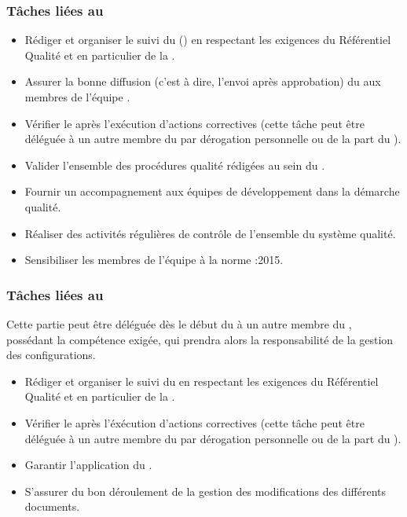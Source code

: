 \subsubsection*{Tâches liées au \PQCourt}
\begin{itemize}
	\item Rédiger et organiser le suivi du \PQ (\PQCourt) en respectant les exigences du Référentiel Qualité et en particulier de la \DGQDEUXCourt.
	\item Assurer la bonne diffusion (c’est à dire, l’envoi après approbation) du \PQCourt{} aux membres de l’équipe \PICCourt.
	\item Vérifier le \PQCourt{} après l’exécution d’actions correctives (cette tâche peut être déléguée à un autre membre du \PICCourt par dérogation personnelle ou de la part du \CP).
	\item Valider l’ensemble des procédures qualité rédigées au sein du \PICCourt.
	\item Fournir un accompagnement aux équipes de développement dans la démarche qualité.
	\item Réaliser des activités régulières de contrôle de l’ensemble du système qualité.
	\item Sensibiliser les membres de l’équipe \PICCourt à la norme :2015.
\end{itemize}

\subsubsection*{Tâches liées au \PGCCourt}

Cette partie peut être déléguée dès le début du \PICCourt à un autre membre du \PICCourt, possédant la compétence exigée, qui prendra alors la responsabilité de la gestion des configurations.

\begin{itemize}
	\item Rédiger et organiser le suivi du \PGCCourt{} en respectant les exigences du Référentiel Qualité et en particulier de la \DGQDEUXCourt.
	\item Vérifier le \PGCCourt après l’éxécution d’actions correctives (cette tâche peut être déléguée à un autre membre du \PICCourt par dérogation personnelle ou de la part du \CP).
	\item Garantir l’application du \PGCCourt.
	\item S’assurer du bon déroulement de la gestion des modifications des différents documents.
\end{itemize}

